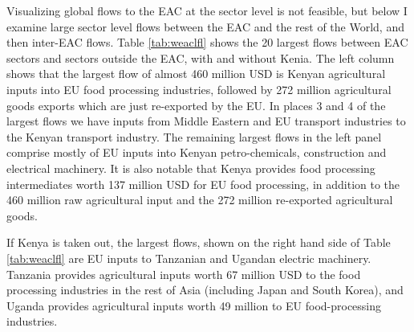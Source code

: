 \documentclass[a4paper]{article}
\begin{document}
Visualizing global flows to the EAC at the sector level is not feasible, but below I examine large sector level flows between the EAC and the rest of the World, and then inter-EAC flows. Table \ref{tab:weaclfl} shows the 20 largest flows between EAC sectors and sectors outside the EAC, with and without Kenia. The left column shows that the largest flow of almost 460 million USD is Kenyan agricultural inputs into EU food processing industries, followed by 272 million agricultural goods exports which are just re-exported by the EU.  In places 3 and 4 of the largest flows we have inputs from Middle Eastern and EU transport industries to the Kenyan transport industry. The remaining largest flows in the left panel comprise mostly of EU inputs into Kenyan petro-chemicals, construction and electrical machinery.  It is also notable that Kenya provides food processing intermediates worth 137 million USD for EU food processing, in addition to the 460 million raw agricultural input and the 272 million re-exported agricultural goods. \newline

If Kenya is taken out, the largest flows, shown on the right hand side of Table \ref{tab:weaclfl} are EU inputs to Tanzanian and Ugandan electric machinery. Tanzania provides agricultural inputs worth 67 million USD to the food processing industries in the rest of Asia (including Japan and South Korea), and Uganda provides agricultural inputs worth 49 million to EU food-processing industries.  
\end{document}
